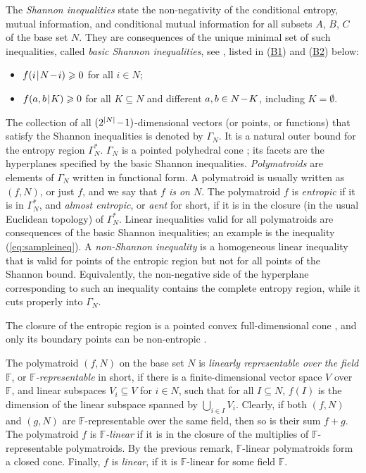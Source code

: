 \documentclass[reqno]{amsart}
\theoremstyle{definition}
\newcommand\tsp{\mkern 1.5mu}
\def\|{\mkern1.5mu{|}\mkern1.5mu}
\renewcommand\ge{\geqslant}\renewcommand\le{\leqslant}
\def\m#1{\tsp{#1}\tsp}
\def\sm{\tsp{-}\tsp} %
\def\G#1{\Gamma_{\!#1}}
\def\Ga#1{\Gamma^*_{\!#1}}
\newcommand\bref[1]{\hyperlink{#1}{#1}}
\newcommand\blabel[1]{\hypertarget{#1}{}}
\begin{document}
The \emph{Shannon inequalities} state the non-negativity of the conditional
entropy, mutual information, and conditional mutual information for all
subsets $A$, $B$, $C$ of the base set $N$. They are consequences of the
unique minimal set of such inequalities, called \emph{basic Shannon
inequalities}, see \cite{yeung-book}, listed in (\bref{B1}) and (\bref{B2})
below:
\begin{itemize}\setlength\itemsep{3pt plus 1pt minus 2pt}
\item[(B1)]\blabel{B1}$f(i\|N\sm i)\ge 0$ for all $i\in N$;
\item[(B2)]\blabel{B2}$f(a,b\|K)\ge 0$ for all $K\subseteq N$ and
different $a,b\in N\sm K$, including $K=\emptyset$.
\end{itemize}
The collection of all $(2^{|N|}\m-1)$-dimensional vectors (or points, or
functions) that satisfy the Shannon inequalities is denoted by $\G N$. It is
a natural outer bound for the entropy region $\Ga N$. $\G N$ is a pointed
polyhedral cone \cite{ziegler}; its facets are the hyperplanes specified by
the basic Shannon inequalities. \emph{Polymatroids} are elements of $\G N$
written in functional form. A polymatroid is usually written as $(f,N)$, or
just $f$, and we say that \emph{$f$ is on $N$}. The polymatroid $f$ is
\emph{entropic} if it is in $\Ga N$, and \emph{almost entropic}, or
\emph{aent} for short, if it is in the closure (in the usual Euclidean
topology) of $\Ga N$. Linear inequalities valid for all polymatroids are
consequences of the basic Shannon inequalities; an example is the inequality
(\ref{eq:sampleineq}). A \emph{non-Shannon inequality} is a homogeneous
linear inequality that is valid for points of the entropic region but not
for all points of the Shannon bound. Equivalently, the non-negative side of
the hyperplane corresponding to such an inequality contains the complete
entropy region, while it cuts properly into $\G N$.

The closure of the entropic region is a pointed convex full-dimensional
cone \cite{yeung-book}, and only its boundary points can be non-entropic
\cite{M.fmadhe}.
 
\smallskip
The polymatroid $(f,N)$ on the base set $N$ is \emph{linearly representable
over the field $\mathbb F$}, or \emph{ $\mathbb F$-representable} in short,
if there is a finite-dimensional vector space $V$ over $\mathbb F$, and
linear subspaces $V_i\subseteq V$ for $i\in N$, such that for all
$I\subseteq N$, $f(I)$ is the dimension of the linear subspace spanned by
$\bigcup_{i\in I} V_i$. Clearly, if both $(f,N)$ and $(g,N)$ are $\mathbb
F$-representable over the same field, then so is their sum $f+g$. The
polymatroid $f$ is \emph{$\mathbb F$-linear} if it is in the closure of the
multiplies of $\mathbb F$-representable polymatroids. By the previous
remark, $\mathbb F$-linear polymatroids form a closed cone. Finally, $f$ is
\emph{linear}, if it is $\mathbb F$-linear for some field $\mathbb F$.
\end{document}
